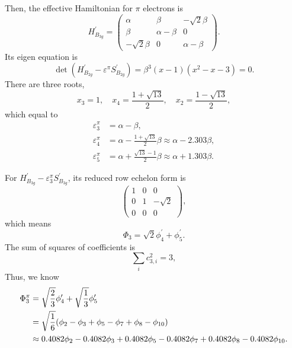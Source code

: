 \documentclass[a4paper]{book}
\newcommand{\Hp}{H^\prime}
\newcommand{\Sp}{S^\prime}
\begin{document}
\begin{solution}
\begin{enumerate}[label=(\alph*)]
		Then, the effective Hamiltonian for $\pi$ electrons is
		\begin{equation*}
			H^\prime_{B_{3g}} = \begin{pmatrix}
				\alpha	&	\beta	&	-\sqrt{2}\beta	\\
				\beta	&	\alpha-\beta	&	0		\\
				-\sqrt{2}\beta	&	0	&\alpha-\beta
				\end{pmatrix}.				
		\end{equation*}
		Its eigen equation is		
		\begin{equation*}
			\det(\Hp_{B_{2g}}-\varepsilon^\pi \Sp_{B_{2g}}) = \beta^3 (x-1)( x^2 - x - 3 ) = 0.
		\end{equation*}
		There are three roots,
		\begin{equation*}
			x_3 = 1, \quad x_4 = \frac{1+\sqrt{13}}{2}, \quad x_2 = \frac{1-\sqrt{13}}{2},
		\end{equation*}
		which equal to
		\begin{align}
			\varepsilon^\pi_3 &= \alpha - \beta, \\
			\varepsilon^\pi_4 &= \alpha - \frac{1+\sqrt{13}}{2}\beta \approx \alpha - 2.303 \beta, \\
			\varepsilon^\pi_5 &= \alpha + \frac{\sqrt{13}-1}{2}\beta \approx \alpha + 1.303 \beta.
		\end{align}
		
		For $\Hp_{B_{3g}}-\varepsilon^\pi_3 \Sp_{B_{3g}}$, its reduced row echelon form is
		\begin{equation*}
			\begin{pmatrix}
				1	& 0	&	0	\\	0	&	1	&	-\sqrt{2}	\\	0	&	0	&	0
			\end{pmatrix},
		\end{equation*}
		which means
		\begin{equation*}
			\Phi_3 = \sqrt{2}\phi^\prime_4 + \phi^\prime_5.
		\end{equation*}
		The sum of squares of coefficients is
		\begin{equation*}
			\sum_{i} c^2_{3,i} = 3,
		\end{equation*}
		Thus, we know
		\begin{align}
			\Phi^\pi_3 &= \sqrt{\frac{2}{3}} \phi^\prime_4 + \sqrt{\frac{1}{3}} \phi^\prime_5	\notag \\
			&= \sqrt{\frac{1}{6}} (\phi_2 - \phi_3 +\phi_5 - \phi_7 + \phi_8 -\phi_{10})  \notag \\
			&\approx 0.4082 \phi_2 - 0.4082 \phi_3 + 0.4082 \phi_5 -  0.4082\phi_7 + 0.4082 \phi_8 - 0.4082 \phi_{10}.
		\end{align}
		

\end{enumerate}
\end{solution}
\end{document}
